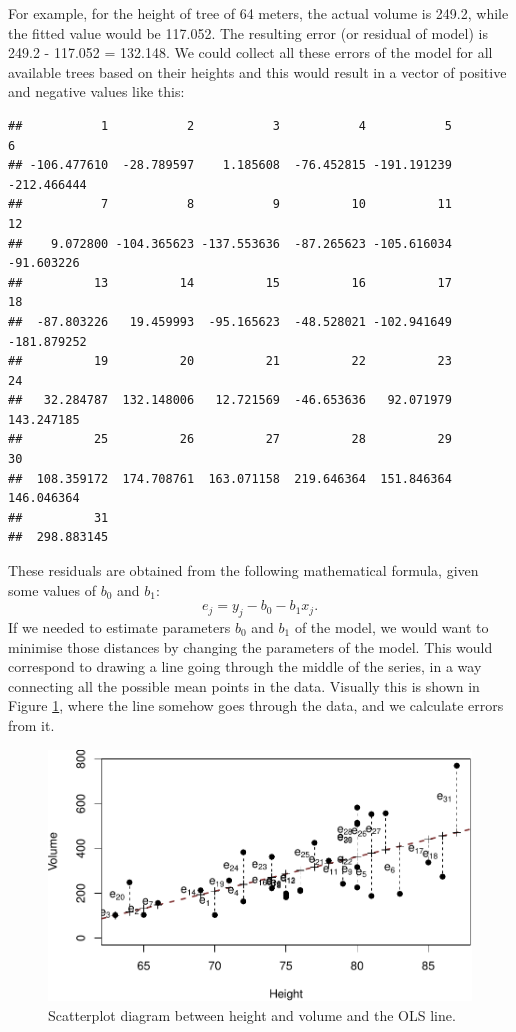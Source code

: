 \documentclass[
]{book}
\theoremstyle{definition}
\theoremstyle{definition}
\theoremstyle{definition}
\theoremstyle{definition}
\theoremstyle{remark}
\begin{document}
For example, for the height of tree of 64 meters, the actual volume is 249.2, while the fitted value would be 117.052. The resulting error (or residual of model) is 249.2 - 117.052 = 132.148. We could collect all these errors of the model for all available trees based on their heights and this would result in a vector of positive and negative values like this:

\begin{verbatim}
##           1           2           3           4           5           6 
## -106.477610  -28.789597    1.185608  -76.452815 -191.191239 -212.466444 
##           7           8           9          10          11          12 
##    9.072800 -104.365623 -137.553636  -87.265623 -105.616034  -91.603226 
##          13          14          15          16          17          18 
##  -87.803226   19.459993  -95.165623  -48.528021 -102.941649 -181.879252 
##          19          20          21          22          23          24 
##   32.284787  132.148006   12.721569  -46.653636   92.071979  143.247185 
##          25          26          27          28          29          30 
##  108.359172  174.708761  163.071158  219.646364  151.846364  146.046364 
##          31 
##  298.883145
\end{verbatim}

These residuals are obtained from the following mathematical formula, given some values of \(b_0\) and \(b_1\):
\begin{equation}
    e_j = y_j - {b}_0 - {b}_1 x_j.
    \label{eq:SLRFormulaEstimatedError}
\end{equation}
If we needed to estimate parameters \({b}_0\) and \({b}_1\) of the model, we would want to minimise those distances by changing the parameters of the model. This would correspond to drawing a line going through the middle of the series, in a way connecting all the possible mean points in the data. Visually this is shown in Figure \ref{fig:TreesModelOLS}, where the line somehow goes through the data, and we calculate errors from it.

\begin{figure}
\centering
\includegraphics{Svetunkov---Statistics-for-Business-Analytics_files/figure-latex/TreesModelOLS-1.pdf}
\caption{\label{fig:TreesModelOLS}Scatterplot diagram between height and volume and the OLS line.}
\end{figure}
\end{document}
